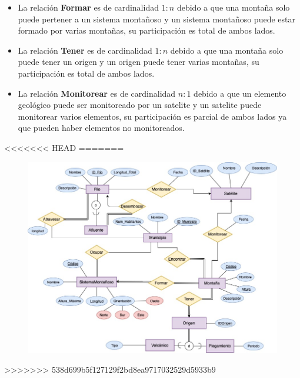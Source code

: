 \documentclass[letterpaper,11pt]{article}
\begin{document}
\begin{itemize}
\begin{itemize}
\begin{itemize}
      \item La relación \textbf{Formar} es de cardinalidad $1:n$ debido a que una montaña
            solo puede pertener a un sistema montañoso y un sistema montañoso puede estar
            formado por varias montañas, su participación es total de ambos lados.

      \item La relación \textbf{Tener} es de cardinalidad $1:n$ debido a que una montaña
            solo puede tener un origen y un origen puede tener varias montañas, su
            participación es total de ambos lados.

      \item La relación \textbf{Monitorear} es de cardinalidad $n:1$ debido a que un
            elemento geológico puede ser monitoreado por un satelite y un satelite puede
            monitorear varios elementos, su participación es parcial de ambos lados ya que
            pueden haber elementos no monitoreados.
      \end{itemize}



    \end{itemize}
<<<<<<< HEAD
=======

 \begin{figure}[h]
  \centering
  \includegraphics[scale=0.5]{./imagenes/Ejercicio2b.jpeg}
  \end{figure}

>>>>>>> 538d699b5f127129f2bd8ea9717032529d5933b9
\end{itemize}
\end{document}
